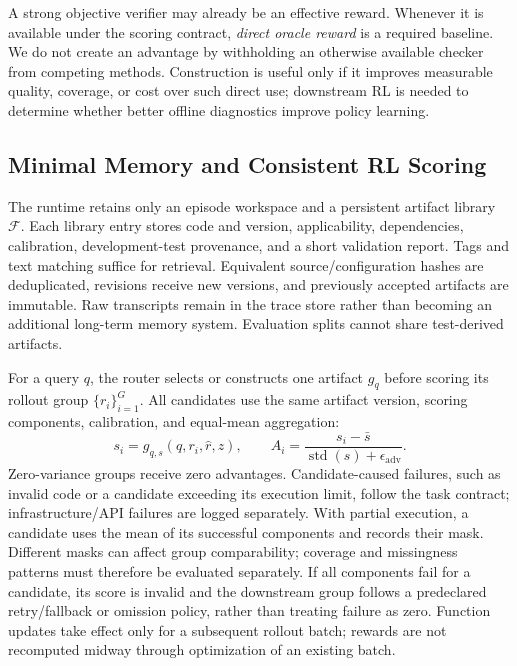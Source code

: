 A strong objective verifier may already be an effective reward. Whenever it is available under the scoring contract, \emph{direct oracle reward} is a required baseline. We do not create an advantage by withholding an otherwise available checker from competing methods. Construction is useful only if it improves measurable quality, coverage, or cost over such direct use; downstream RL is needed to determine whether better offline diagnostics improve policy learning.

\subsection{Minimal Memory and Consistent RL Scoring}
\label{sec:library_memory}

The runtime retains only an episode workspace and a persistent artifact library $\mathcal F$. Each library entry stores code and version, applicability, dependencies, calibration, development-test provenance, and a short validation report. Tags and text matching suffice for retrieval. Equivalent source/configuration hashes are deduplicated, revisions receive new versions, and previously accepted artifacts are immutable. Raw transcripts remain in the trace store rather than becoming an additional long-term memory system. Evaluation splits cannot share test-derived artifacts.

For a query $q$, the router selects or constructs one artifact $g_q$ before scoring its rollout group $\{r_i\}_{i=1}^{G}$. All candidates use the same artifact version, scoring components, calibration, and equal-mean aggregation:
\begin{equation}
    s_i=g_{q,s}(q,r_i,\hat r,z),\qquad
    A_i=\frac{s_i-\bar s}{\operatorname{std}(s)+\epsilon_{\mathrm{adv}}}.
\end{equation}
Zero-variance groups receive zero advantages. Candidate-caused failures, such as invalid code or a candidate exceeding its execution limit, follow the task contract; infrastructure/API failures are logged separately. With partial execution, a candidate uses the mean of its successful components and records their mask. Different masks can affect group comparability; coverage and missingness patterns must therefore be evaluated separately. If all components fail for a candidate, its score is invalid and the downstream group follows a predeclared retry/fallback or omission policy, rather than treating failure as zero. Function updates take effect only for a subsequent rollout batch; rewards are not recomputed midway through optimization of an existing batch.

